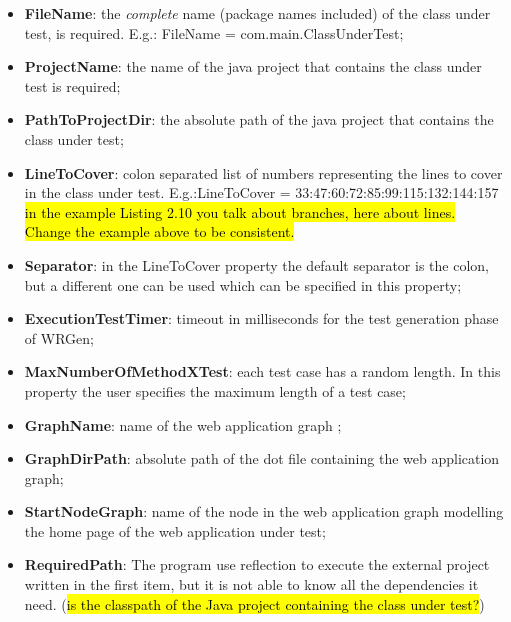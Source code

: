 \begin{itemize}
	\item \textbf{FileName}: the \textit{complete} name (package names included) of the class under test, is required.	E.g.: FileName = com.main.ClassUnderTest;
	\item \textbf{ProjectName}: the name of the java project that contains the class under test is required;
	\item \textbf{PathToProjectDir}: the absolute path of the java project that contains the class under test;
	\item \textbf{LineToCover}: colon separated list of numbers representing the lines to cover in the class under test. E.g.:LineToCover = 33:47:60:72:85:99:115:132:144:157 \hl{in the example Listing 2.10 you talk about branches, here about lines. Change the example above to be consistent.}
	\item \textbf{Separator}: in the LineToCover property the default separator is the colon, but a different one can be used which can be specified in this property;
	\item \textbf{ExecutionTestTimer}: timeout in milliseconds for the test generation phase of WRGen;
	\item \textbf{MaxNumberOfMethodXTest}: each test case has a random length. In this property the user specifies the maximum length of a test case;
	\item \textbf{GraphName}: name of the web application graph ;
	\item \textbf{GraphDirPath}: absolute path of the dot file containing the web application graph;
	\item \textbf{StartNodeGraph}: name of the node in the web application graph modelling the home page of the web application under test;
	\item \textbf{RequiredPath}: The program use reflection to execute the external project written in the first item, but it is not able to know all the dependencies it need. (\hl{is the classpath of the Java project containing the class under test?})
\end{itemize}